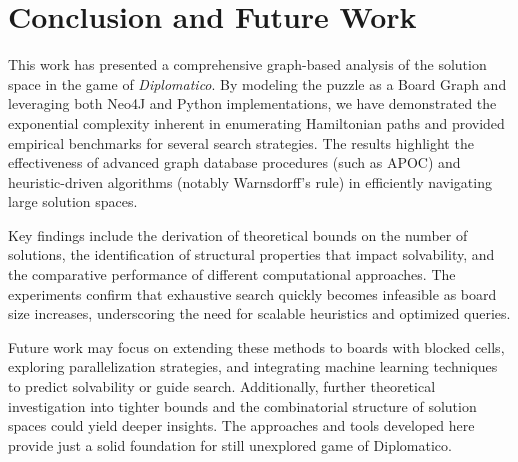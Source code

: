 \documentclass[conference]{IEEEtran}
\begin{document}
\section{Conclusion and Future Work}
This work has presented a comprehensive graph-based analysis of the solution space in the game of \textit{Diplomatico}. By modeling the puzzle as a Board Graph and leveraging both Neo4J and Python implementations, we have demonstrated the exponential complexity inherent in enumerating Hamiltonian paths and provided empirical benchmarks for several search strategies. The results highlight the effectiveness of advanced graph database procedures (such as APOC) and heuristic-driven algorithms (notably Warnsdorff's rule) in efficiently navigating large solution spaces. 

Key findings include the derivation of theoretical bounds on the number of solutions, the identification of structural properties that impact solvability, and the comparative performance of different computational approaches. The experiments confirm that exhaustive search quickly becomes infeasible as board size increases, underscoring the need for scalable heuristics and optimized queries.

Future work may focus on extending these methods to boards with blocked cells, exploring parallelization strategies, and integrating machine learning techniques to predict solvability or guide search. Additionally, further theoretical investigation into tighter bounds and the combinatorial structure of solution spaces could yield deeper insights. The approaches and tools developed here provide just a solid foundation for still unexplored game of Diplomatico.




\newpage
\appendices
\end{document}
